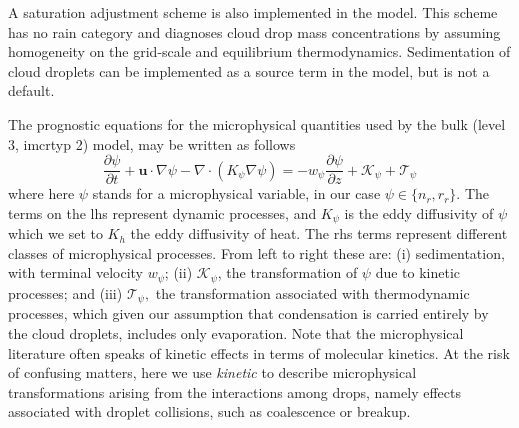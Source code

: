 \documentclass[11pt,a4paper]{article}
\begin{document}
A saturation adjustment scheme is also implemented in the model.
This scheme has no rain category and diagnoses cloud drop mass
concentrations by assuming homogeneity on the grid-scale and
equilibrium thermodynamics. Sedimentation of cloud droplets can
be implemented as a source term in the model, but is not a default.

The prognostic equations for the microphysical quantities used by the
bulk (level 3, imcrtyp 2) model, may be written as follows
\begin{equation}
\frac{\partial \psi}{\partial t} + \mathbf{u}\cdot \nabla\psi - \nabla
\cdot \left(K_\psi \nabla \psi \right)= -w_{\psi} \frac{\partial
\psi}{\partial z} + \mathcal{K}_{\psi} + \mathcal{T}_{\psi}
\label{eq:psi}
\end{equation}
where here $\psi$ stands for a microphysical variable, in our case
$\psi\in\{n_r,r_r\}$. The terms on the lhs represent dynamic
processes, and $K_{\psi}$ is the eddy diffusivity of $\psi$ which we
set to $K_h$ the eddy diffusivity of heat. The rhs terms represent
different classes of microphysical processes.  From left to right
these are: (i) sedimentation, with terminal velocity $w_\psi$; (ii)
$\mathcal{K}_\psi$, the transformation of $\psi$ due to kinetic
processes; and (iii) $\mathcal{T}_\psi,$ the transformation associated
with thermodynamic processes, which given our assumption that
condensation is carried entirely by the cloud droplets, includes only
evaporation.  Note that the microphysical literature often speaks of
kinetic effects in terms of molecular kinetics.  At the risk of
confusing matters, here we use \emph{kinetic} to describe
microphysical transformations arising from the interactions among
drops, namely effects associated with droplet collisions, such as
coalescence or breakup.
\end{document}
